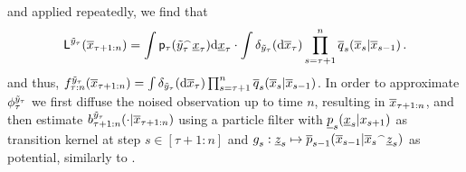     and applied repeatedly, we find that 
    \[ 
        \mathsf{L}^{\tilde\lmeas_\tau}(\ltopstate_{\tau+1:n}) = \int \bwmarg{\tau}{\cat{\tilde\lmeas_\tau}{\lbottomstate_\tau}} \rmd \lbottomstate_\tau \cdot \int \delta_{\tilde\lmeas_\tau}(\rmd \ltopstate_\tau) \prod_{s = \tau+1}^n \tfwtrans{s}{\ltopstate_{s-1}}{\ltopstate_s} \eqsp.
    \]
    and thus, $f^{\tilde\lmeas_\tau} _{\tau:n}(\ltopstate_{\tau+1:n}) = \int \delta_{\tilde\lmeas_\tau}(\rmd \ltopstate_\tau) \prod_{s = \tau+1}^n \tfwtrans{s}{\ltopstate_{s-1}}{\ltopstate_s}$. In order to approximate $\filter{\tau}{\tilde\lmeas_\tau}{}$ we first diffuse the noised observation up to time $n$, resulting in $\overline{x}_{\tau+1:n}$, and then estimate $b^{\tilde{y}_\tau} _{\tau+1:n}(\cdot | \overline{x}_{\tau+1:n})$ using a particle filter with $\bbwtrans{}{s}{\lstate_{s+1}}{\lbottomstate_s}$ as transition kernel at step 
    $s \in [\tau+1:n]$ and $\pot{s}{}{}: \underline{z}_s \mapsto \tbwtrans{}{s-1}{\cat{\ltopstate_s}{\underline{z}_s}}{\ltopstate_{s-1}}$ as potential, similarly to \smcdiff. 